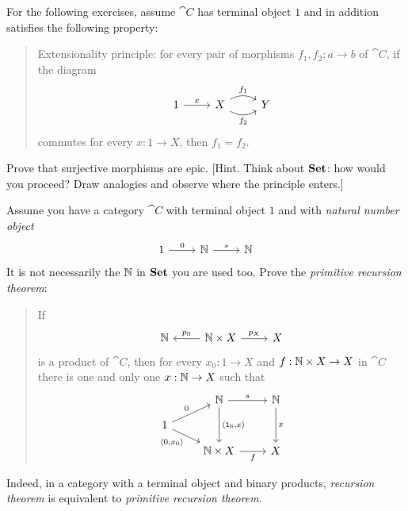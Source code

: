 \begin{exercise}
  For the following exercises, assume \(\cat C\) has terminal object
  \(1\) and in addition satisfies the following property:
  \begin{quotation} {\sc Extensionality principle}: for every pair of
    morphisms \(f_1, f_2 : a \to b\) of \(\cat C\), if the diagram
    \[\begin{tikzcd}
        1 \ar["x", r] & X \ar["{f_1}", r, bend left] \ar["{f_2}", r,
        bend right, swap] & Y
      \end{tikzcd}\] commutes for every \(x : 1 \to X\), then
    \(f_1 = f_2\).
  \end{quotation}
  \begin{tcbenum}
  \item Prove that surjective morphisms are epic. [Hint. Think about
    \(\mathbf{Set}\): how would you proceed? Draw analogies and observe where
    the principle enters.]
%
  \item {}
  \end{tcbenum}
\end{exercise}

\begin{exercise}
  Assume you have a category \(\cat C\) with terminal object \(1\) and
  with {\em natural number object}
  \[\begin{tikzcd}
      1 \ar["0", r] & \naturals \ar["s", r] & \naturals
    \end{tikzcd}\]   It is not necessarily the \(\mathbb N\) in
  \(\mathbf{Set}\) you are used too. Prove the {\em primitive recursion
    theorem}:
  \begin{quotation}
    If
    \[\begin{tikzcd}
        \naturals & \naturals \times X \ar["{p_\naturals}", l, swap]
        \ar["{p_X}", r] & X
      \end{tikzcd}\] is a product of \(\cat C\), then for every
    \(x_0 : 1 \to X\) and \(f : \mathbb N \times X \to X\) in
    \(\cat C\) there is one and only one \(x : \mathbb N \to X\) such
    that
    \[\begin{tikzcd}[row sep=small]
        & \naturals \ar["s", r] \ar["{\angled{\id_\naturals, x}}", dd] & \naturals \ar["x", dd] \\
        1 \ar["0", ur] \ar["{\angled{0, x_0}}", dr, swap] \\
        & \naturals \times X \ar["f", r, swap] & X
      \end{tikzcd}\] 
  \end{quotation}
  Indeed, in a category with a terminal object and binary products,
  {\em recursion theorem} is equivalent to {\em primitive recursion
    theorem}. 
\end{exercise}

